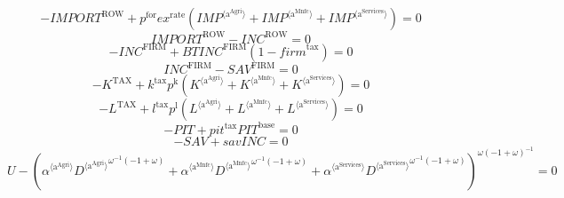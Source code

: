 \begin{equation}
-{I\!M\!P\!O\!R\!T}^{\mathrm{ROW}} + {p^{\mathrm{for}}} {{e\!x}^{\mathrm{rate}}} \left({{I\!M\!P}}^{\langle \mathrm{a}^{\mathrm{Agri}}\rangle} + {{I\!M\!P}}^{\langle \mathrm{a}^{\mathrm{Mnfc}}\rangle} + {{I\!M\!P}}^{\langle \mathrm{a}^{\mathrm{Services}}\rangle}\right) = 0
\end{equation}
\begin{equation}
{I\!M\!P\!O\!R\!T}^{\mathrm{ROW}} - {I\!N\!C}^{\mathrm{ROW}} = 0
\end{equation}
\begin{equation}
-{I\!N\!C}^{\mathrm{FIRM}} + {{B\!T\!I\!N\!C}^{\mathrm{FIRM}}} \left(1 - {f\!i\!r\!m}^{\mathrm{tax}}\right) = 0
\end{equation}
\begin{equation}
{I\!N\!C}^{\mathrm{FIRM}} - {S\!A\!V}^{\mathrm{FIRM}} = 0
\end{equation}
\begin{equation}
-K^{\mathrm{TAX}} + {k^{\mathrm{tax}}} {p^{\mathrm{k}}} \left({K}^{\langle \mathrm{a}^{\mathrm{Agri}}\rangle} + {K}^{\langle \mathrm{a}^{\mathrm{Mnfc}}\rangle} + {K}^{\langle \mathrm{a}^{\mathrm{Services}}\rangle}\right) = 0
\end{equation}
\begin{equation}
-L^{\mathrm{TAX}} + {l^{\mathrm{tax}}} {p^{\mathrm{l}}} \left({L}^{\langle \mathrm{a}^{\mathrm{Agri}}\rangle} + {L}^{\langle \mathrm{a}^{\mathrm{Mnfc}}\rangle} + {L}^{\langle \mathrm{a}^{\mathrm{Services}}\rangle}\right) = 0
\end{equation}
\begin{equation}
-{P\!I\!T} + {{p\!i\!t}^{\mathrm{tax}}} {{P\!I\!T}^{\mathrm{base}}} = 0
\end{equation}
\begin{equation}
-{S\!A\!V} + {{s\!a\!v}} {{I\!N\!C}} = 0
\end{equation}
\begin{equation}
U - \left({{\alpha}^{\langle \mathrm{\mathrm{a}^{\mathrm{Agri}}}\rangle}} {{{D}^{\langle \mathrm{a}^{\mathrm{Agri}}\rangle}}^{{\omega}^{-1} \left(-1 + \omega\right)}} + {{\alpha}^{\langle \mathrm{\mathrm{a}^{\mathrm{Mnfc}}}\rangle}} {{{D}^{\langle \mathrm{a}^{\mathrm{Mnfc}}\rangle}}^{{\omega}^{-1} \left(-1 + \omega\right)}} + {{\alpha}^{\langle \mathrm{\mathrm{a}^{\mathrm{Services}}}\rangle}} {{{D}^{\langle \mathrm{a}^{\mathrm{Services}}\rangle}}^{{\omega}^{-1} \left(-1 + \omega\right)}}\right)^{{\omega} \left(-1 + \omega\right)^{-1}} = 0
\end{equation}

